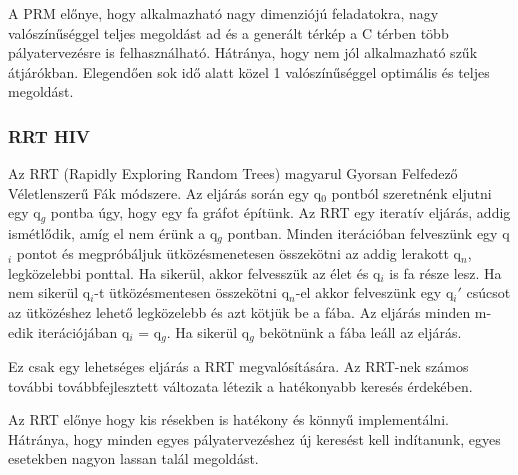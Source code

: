 A PRM előnye, hogy alkalmazható nagy dimenziójú feladatokra, nagy valószínűséggel teljes megoldást ad és a generált térkép a C térben több pályatervezésre is felhasználható. Hátránya, hogy nem jól alkalmazható szűk átjárókban. Elegendően sok idő alatt közel 1 valószínűséggel optimális és teljes megoldást.

\subsubsection{RRT HIV}

Az RRT (Rapidly Exploring Random Trees) magyarul Gyorsan Felfedező Véletlenszerű Fák módszere. Az eljárás során egy q$_0$ pontból szeretnénk eljutni egy q$_g$ pontba úgy, hogy egy fa gráfot építünk. Az RRT egy iteratív eljárás, addig ismétlődik, amíg el nem érünk a q$_g$ pontban. Minden iterációban felveszünk egy q$_i$ pontot és megpróbáljuk ütközésmenetesen összekötni az addig lerakott q$_n$, legközelebbi ponttal. Ha sikerül, akkor felvesszük az élet és q$_i$ is fa része lesz. Ha nem sikerül q$_i$-t ütközésmentesen összekötni q$_n$-el akkor felveszünk egy q$_i'$ csúcsot az ütközéshez lehető legközelebb és azt kötjük be a fába. Az eljárás minden m-edik iterációjában q$_i$ = q$_g$. Ha sikerül q$_g$ bekötnünk a fába leáll az eljárás.

Ez csak egy lehetséges eljárás a RRT megvalósítására. Az RRT-nek számos további továbbfejlesztett változata létezik a hatékonyabb keresés érdekében.

Az RRT előnye hogy kis résekben is hatékony és könnyű implementálni. Hátránya, hogy minden egyes pályatervezéshez új keresést kell indítanunk, egyes esetekben nagyon lassan talál megoldást.
